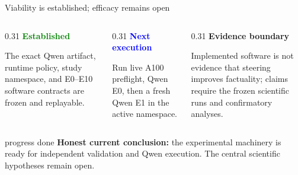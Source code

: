 \documentclass[aspectratio=169,11pt]{beamer}
\begin{document}
\begin{frame}{Viability is established; efficacy remains open}
  \small
  \begin{columns}[T,onlytextwidth]
    \begin{column}{0.31\textwidth}
      \textcolor{Green}{\bfseries Established}\par\vspace{0.15cm}
      The exact Qwen artifact, runtime policy, study namespace, and E0--E10 software contracts are frozen and replayable.
    \end{column}
    \begin{column}{0.31\textwidth}
      \textcolor{Blue}{\bfseries Next execution}\par\vspace{0.15cm}
      Run live A100 preflight, Qwen E0, then a fresh Qwen E1 in the active namespace.
    \end{column}
    \begin{column}{0.31\textwidth}
      \textcolor{Amber}{\bfseries Evidence boundary}\par\vspace{0.15cm}
      Implemented software is not evidence that steering improves factuality; claims require the frozen scientific runs and confirmatory analyses.
    \end{column}
  \end{columns}
  \vspace{0.38cm}
  \begin{beamercolorbox}[rounded=true,sep=0.48em]{progress done}
    \textbf{Honest current conclusion:} the experimental machinery is ready for independent validation and Qwen execution. The central scientific hypotheses remain open.
  \end{beamercolorbox}
\end{frame}
\end{document}

